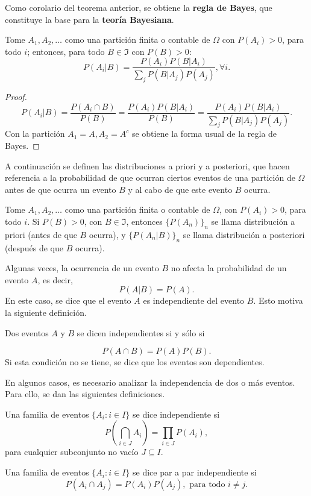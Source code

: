 		Como corolario del teorema anterior, se obtiene la \textbf{regla de Bayes}, que constituye la base para la \textbf{teoría Bayesiana}.
		\begin{corol}
			Tome $A_1,A_2,\dots$ como una partición finita o contable de $\Omega$ con $P(A_i)>0$, para todo $i$; entonces, para todo $B\in\Im$ con $P(B)>0:$
			$$P(A_i | B)=\frac{P(A_i)P(B| A_i)}{\sum_j P(B|A_j)P(A_j)}, \forall i.$$
		\end{corol}
		\begin{proof}
		$$P(A_i|B)=\frac{P(A_i\cap B)}{P(B)}=\frac{P(A_i)P(B|A_i)}{P(B)}=\frac{P(A_i)P(B| A_i)}{\sum_j P(B|A_j)P(A_j)}.$$
		Con la partición $A_1=A, A_2=A^c$ se obtiene la forma usual de la regla de Bayes.
	\end{proof}
	
	A continuación se definen las distribuciones a priori y a posteriori, que hacen referencia a la probabilidad de que ocurran ciertos eventos de una partición de $\Omega$ antes de que ocurra un evento $B$ y al cabo de que este evento $B$ ocurra.
	\begin{defi}
		Tome $A_1,A_2,\dots$ como una partición finita o contable de $\Omega$, con $P(A_i)>0$, para todo $i$. Si $P(B)>0$, con $B\in\Im$, entonces $\{P(A_n)\}_n$ se llama distribución a priori (antes de que $B$ ocurra), y $\{P(A_n|B)\}_n$ se llama distribución a posteriori (después de que $B$ ocurra).
	\end{defi}
	Algunas veces, la ocurrencia de un evento $B$ no afecta la probabilidad de un evento $A$, es decir,
	$$P(A|B)=P(A).$$
	En este caso, se dice que el evento $A$ es independiente del evento $B$. Esto motiva la siguiente definición.
	\begin{defi}
		Dos eventos $A$ y $B$ se dicen independientes si y sólo si
		
		$$P(A\cap B)=P(A)P(B).$$
		Si esta condición no se tiene, se dice que los eventos son dependientes.
	\end{defi}
	
	En algunos casos, es necesario analizar la independencia de dos o más eventos. Para ello, se dan las siguientes definiciones.
	\begin{defi}
		Una familia de eventos $\{A_i: i\in I\}$ se dice independiente si
		$$P\left(\bigcap_{i\in J} A_i\right)=\prod_{i\in J}P(A_i),$$
		para cualquier subconjunto no vacío $J\subseteq I$.
	\end{defi}
	\begin{defi}
		Una familia de eventos $\{A_i: i\in I\}$ se dice par a par independiente si
		$$P(A_i\cap A_j)=P(A_i)P(A_j), \text{ para todo }i\neq j.$$
	\end{defi}
	
